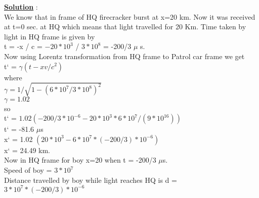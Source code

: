 \documentclass[10pt, a4paper]{article}
\begin{document}
\begin{enumerate}
{{\underline {\bf Solution}} : \\
We know that in frame of HQ firecracker burst at x=20 km. Now it was received at t=0 sec. at HQ which means that light travelled for 20 Km. Time taken by
light in HQ frame is given by \\
t = -x / c = \begin{math} -20*10^3 \end{math} / \begin{math} 3*10^8 \end{math} = -200/3 \begin{math} \mu \end{math} s.\\
Now using Lorentz transformation from HQ frame to Patrol car frame we get\\
t` = \begin{math} \gamma (t - xv/c^2) \end{math}\\
where\\
\begin{math} \gamma = 1 / \sqrt{1 - (6*10^7/3*10^8)^2} \end{math}\\
\begin{math} \gamma = 1.02 \end{math}\\
so \\
t` = \begin{math} 1.02 (-200/3 * 10^{-6} - 20*10^3 * 6*10^7/ (9*10^{16})) \end{math}\\
t` = -81.6 \begin{math} \mu \end{math}s\\
x` = 1.02 \begin{math} (20*10^3 - 6*10^7*(-200/3)*10^{-6}) \end{math}\\
x` = 24.49 km.\\
Now in HQ frame for boy x=20 when t = -200/3 \begin{math} \mu \end{math}s.\\
Speed of boy = \begin{math} 3*10^7 \end{math}\\
Distance travelled by boy while light reaches HQ is d = \begin{math} 3*10^7*(-200/3)*10^{-6} \end{math}\\
}
\end{enumerate}
\end{document}
